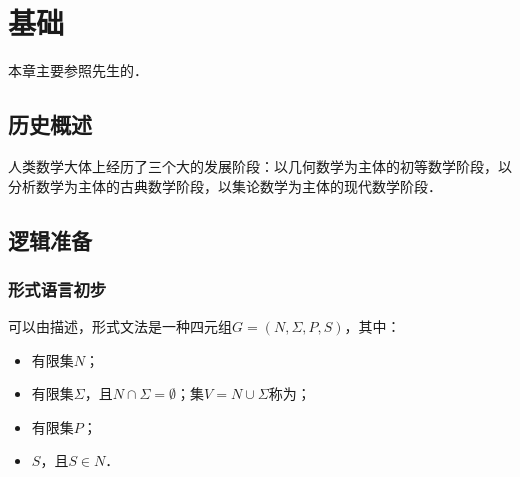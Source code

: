 \chapter{基础}

本章主要参照\citeauthor{WangFt2001}先生的\cite{WangFt2001}．

\section{历史概述}

人类数学大体上经历了三个大的发展阶段：以几何数学为主体的初等数学阶段，以分析数学为主体的古典数学阶段，以集论数学为主体的现代数学阶段．

\section{逻辑准备}

\subsection{形式语言初步}

可以由描述，形式文法是一种四元组$G=(N,\Sigma,P,S)$，其中：
\begin{itemize}
	\item {}有限集$N$；
	\item {}有限集$\Sigma$，且$N\cap\Sigma=\emptyset$；集$V=N\cup\Sigma$称为；
	\item {}有限集$P$；
	\item {}$S$，且$S\in{}N$．
\end{itemize}

